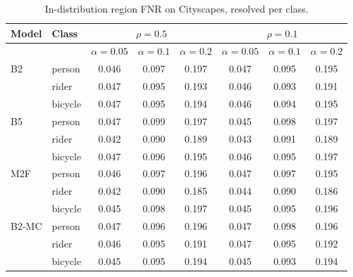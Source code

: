 \begin{table}[t]
\centering
\scriptsize
\setlength{\tabcolsep}{2pt}
\begin{tabular}{llcccccc}
\toprule
Model & Class & \multicolumn{3}{c}{$\rho=0.5$} & \multicolumn{3}{c}{$\rho=0.1$} \\
\midrule
 & & $\alpha=0.05$ & $\alpha=0.1$ & $\alpha=0.2$ & $\alpha=0.05$ & $\alpha=0.1$ & $\alpha=0.2$ \\
\midrule
B2 & person & 0.046 & 0.097 & 0.197 & 0.047 & 0.095 & 0.195 \\
 & rider & 0.047 & 0.095 & 0.193 & 0.046 & 0.093 & 0.191 \\
 & bicycle & 0.047 & 0.095 & 0.194 & 0.046 & 0.094 & 0.195 \\
\addlinespace
B5 & person & 0.047 & 0.099 & 0.197 & 0.045 & 0.098 & 0.197 \\
 & rider & 0.042 & 0.090 & 0.189 & 0.043 & 0.091 & 0.189 \\
 & bicycle & 0.047 & 0.096 & 0.195 & 0.046 & 0.095 & 0.197 \\
\addlinespace
M2F & person & 0.046 & 0.097 & 0.196 & 0.047 & 0.097 & 0.195 \\
 & rider & 0.042 & 0.090 & 0.185 & 0.044 & 0.090 & 0.186 \\
 & bicycle & 0.045 & 0.098 & 0.197 & 0.045 & 0.095 & 0.196 \\
\addlinespace
B2-MC & person & 0.047 & 0.096 & 0.196 & 0.047 & 0.098 & 0.196 \\
 & rider & 0.046 & 0.095 & 0.191 & 0.047 & 0.095 & 0.192 \\
 & bicycle & 0.045 & 0.095 & 0.194 & 0.045 & 0.093 & 0.194 \\
\bottomrule
\end{tabular}
\caption{In-distribution region FNR on Cityscapes, resolved per class.}
\label{tab:perclass}
\end{table}
